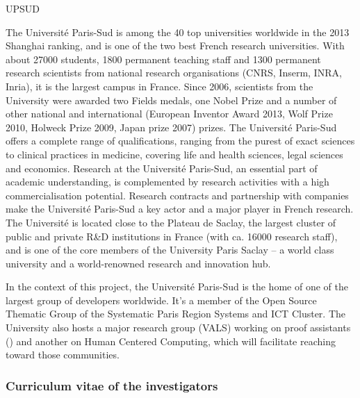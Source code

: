 \begin{sitedescription}{UPSUD} \label{desc:ParisSud}

The Université Paris-Sud is among the 40 top universities worldwide in the
2013 Shanghai ranking, and is one of the two best French research
universities. With about 27000 students, 1800 permanent teaching staff
and 1300 permanent research scientists from national research
organisations (CNRS, Inserm, INRA, Inria), it is the largest campus in
France. Since 2006, scientists from the University were awarded two
Fields medals, one Nobel Prize and a number of other national and international
(European Inventor Award 2013, Wolf Prize 2010, Holweck Prize 2009,
Japan prize 2007) prizes.  The Université Paris-Sud offers a
complete range of qualifications, ranging from the purest of exact
sciences to clinical practices in medicine, covering life and health
sciences, legal sciences and economics. Research at the Université
Paris-Sud, an essential part of academic understanding, is
complemented by research activities with a high commercialisation
potential. Research contracts and partnership with companies make the
Université Paris-Sud a key actor and a major player in French
research.  The Université is located close to the Plateau de Saclay,
the largest cluster of public and private R\&D institutions in France
(with ca. 16000 research staff), and is one of the core members of the
University Paris Saclay – a world class university and a
world-renowned research and innovation hub.

In the context of this project, the Université Paris-Sud is the
home of one of the largest group of \Sage developers worldwide.
It's a member of the Open Source Thematic Group of the Systematic
Paris Region Systems and ICT Cluster. The University also hosts a
major research group (VALS) working on proof assistants () and
another on Human Centered Computing, which will facilitate reaching
toward those communities.


\subsubsection*{Curriculum vitae of the investigators}



%


\end{sitedescription}
